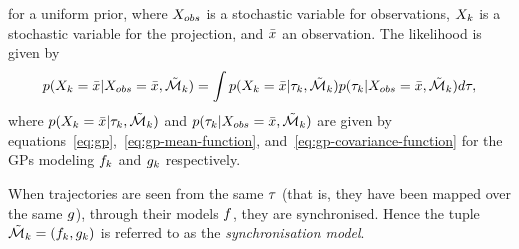 for a uniform prior, where $X_{obs}$ is a stochastic variable for observations,
$X_{k}$ is a stochastic variable for the
projection, and $\bar{x}$ an observation. The likelihood is given by
\begin{equation}
  \label{eq:model-likelihood}
  p(X_{k} = \bar{x} \vert X_{obs} = \bar{x}, \tilde{\mathcal{M}}_{k}) =
  \int p(X_{k} = \bar{x} \vert \tau_{k}, \tilde{\mathcal{M}}_{k}) 
  p(\tau_{k} \vert X_{obs} = \bar{x}, \tilde{\mathcal{M}}_{k}) d\tau,
\end{equation}
where $p(X_{k} = \bar{x} \vert \tau_{k},
\tilde{\mathcal{M}}_{k})$ and $p(\tau_{k} \vert X_{obs} = \bar{x},
\tilde{\mathcal{M}}_{k})$ are given by equations~\ref{eq:gp},~\ref{eq:gp-mean-function},
and~\ref{eq:gp-covariance-function} for the GPs modeling
$f_{k}$ and $g_{k}$ respectively. 

When trajectories are seen from the same
$\tau$ (that is, they have been mapped over the same $g$),
through their models $f$, they are
synchronised. Hence the tuple $\tilde{\mathcal{M}}_{k} = (f_{k},
g_{k})$ is referred to as the \textit{synchronisation model}.


